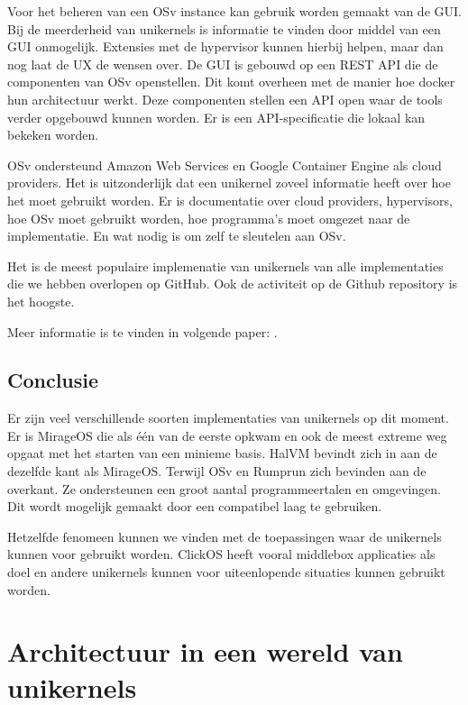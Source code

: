 \documentclass[pdftex,a4paper,12pt,twoside]{report}
\begin{document}
Voor het beheren van een OSv instance kan gebruik worden gemaakt van de GUI. Bij de meerderheid van unikernels is informatie te vinden door middel van een GUI onmogelijk. Extensies met de hypervisor kunnen hierbij helpen, maar dan nog laat de UX de wensen over. De GUI is gebouwd op een REST API die de componenten van OSv openstellen. Dit komt overheen met de manier hoe docker hun architectuur werkt. Deze componenten stellen een API open waar de tools verder opgebouwd kunnen worden. Er is een API-specificatie die lokaal kan bekeken worden.

OSv ondersteund Amazon Web Services en Google Container Engine als cloud providers. Het is uitzonderlijk dat een unikernel zoveel informatie heeft over hoe het moet gebruikt worden. Er is documentatie over cloud providers, hypervisors, hoe OSv moet gebruikt worden, hoe programma's moet omgezet naar de implementatie. En wat nodig is om zelf te sleutelen aan OSv.

Het is de meest populaire implemenatie van unikernels van alle implementaties die we hebben overlopen op GitHub. Ook de activiteit op de Github repository is het hoogste.

Meer informatie is te vinden in volgende paper: \cite{kivity_osvoptimizing_2014}.

\section{Conclusie}

Er zijn veel verschillende soorten implementaties van unikernels op dit moment. Er is MirageOS die als één van de eerste opkwam en ook de meest extreme weg opgaat met het starten van een minieme basis. HalVM bevindt zich in aan de dezelfde kant als MirageOS. Terwijl OSv en Rumprun zich bevinden aan de overkant. Ze ondersteunen een groot aantal programmeertalen en omgevingen. Dit wordt mogelijk gemaakt door een compatibel laag te gebruiken. 

Hetzelfde fenomeen kunnen we vinden met de toepassingen waar de unikernels kunnen voor gebruikt worden. ClickOS heeft vooral middlebox applicaties als doel en andere unikernels kunnen voor uiteenlopende situaties kunnen gebruikt worden.

\chapter{Architectuur in een wereld van unikernels}
\label{ch:architectuur-met-unikernels}
\end{document}
